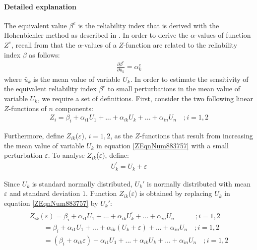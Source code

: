\paragraph*{Detailed explanation}

The equivalent value $\beta^e$ is the reliability index that is derived with the Hohenbichler method as described in . In order to derive the $\alpha$-values of function $Z^e$, recall from  that the $\alpha$-values of a $Z$-function are related to the reliability index $\beta$ as follows: 
\begin{align}
\frac{\partial \beta ^{e} }{\partial \bar{u}_{k} } =\alpha _{k}^{e} \label{ZEqnNum799990} 
\end{align}
where $\bar{u}_k$ is the mean value of variable $U_k$. In order to estimate the sensitivity of the equivalent reliability index $\beta^e$ to small perturbations in the mean value of variable $U_k$, we require a set of definitions. First, consider the two following linear $Z$-functions of $n$ components:
\begin{align}
Z_{i} =\beta _{i} +\alpha _{i1} U_{1} +...+\alpha _{ik} U_{k} +...+\alpha _{in} U_{n} \quad     ;i=1,2\label{ZEqnNum883757} 
\end{align}

Furthermore, define $Z_{ik}$($\varepsilon$), $i=1,2$, as the $Z$-functions that result from increasing the mean value of variable $U_k$ in equation \eqref{ZEqnNum883757} with a small perturbation $\varepsilon$. To analyse $Z_{ik}$($\varepsilon$), define:
\begin{align}
U_{k}^{'} =U_{k} +\varepsilon \label{ZEqnNum189970} 
\end{align}

Since $U_k$ is standard normally distributed, $U_k'$ is normally distributed with mean $\varepsilon$ and standard deviation $1$. Function $Z_{ik}$($\varepsilon$) is obtained by replacing $U_k$ in equation \eqref{ZEqnNum883757} by $U_k'$:
\begin{align}
\begin{array}{l} 
{Z_{ik} \left(\varepsilon \right)=\beta _{i} +\alpha _{i1} U_{1} +...+\alpha _{ik} U_{k}^{'} +...+\alpha _{in} U_{n} \quad   \quad \quad    ;i=1,2} \\
 {\quad \quad    =\beta _{i} +\alpha _{i1} U_{1} +...+\alpha _{ik} \left(U_{k} +\varepsilon \right)+...+\alpha _{in} U_{n} \quad     ;i=1,2} \\
 {\quad \quad    =\left(\beta _{i} +\alpha _{ik} \varepsilon \right)+\alpha _{i1} U_{1} +...+\alpha _{ik} U_{k} +...+\alpha _{in} U_{n} \quad ;i=1,2} \end{array}\label{ZEqnNum876903} 
\end{align}

